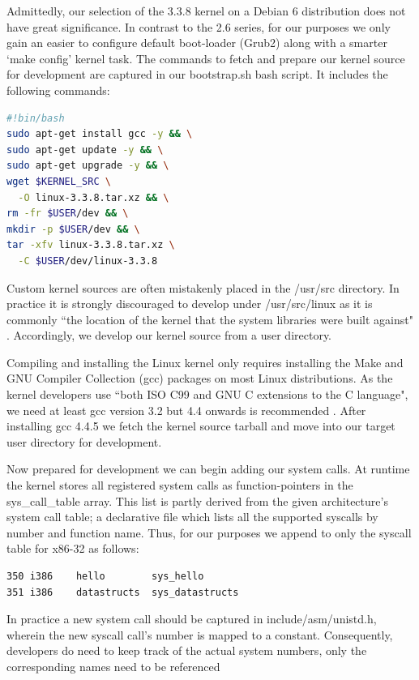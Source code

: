 \documentclass{article}
\begin{document}
\noindent Admittedly, our selection of the 3.3.8 kernel on a Debian 6 distribution
does not have great significance. In contrast to the 2.6 series, for our purposes 
we only gain an easier to configure default boot-loader (Grub2) along with a smarter 
`make config' kernel task. The commands to fetch and prepare our kernel source
for development are captured in our bootstrap\@.sh bash script. It includes the following commands: 
\begin{lstlisting}[language=Bash]
#!bin/bash
sudo apt-get install gcc -y && \
sudo apt-get update -y && \
sudo apt-get upgrade -y && \
wget $KERNEL_SRC \
  -O linux-3.3.8.tar.xz && \
rm -fr $USER/dev && \
mkdir -p $USER/dev && \
tar -xfv linux-3.3.8.tar.xz \
  -C $USER/dev/linux-3.3.8
\end{lstlisting} 
Custom kernel sources are often mistakenly placed in the /usr/src directory. 
In practice it is strongly discouraged to develop under /usr/src/linux as it is
commonly ``the location of the kernel that 
the system libraries were built against" \citep{Love}. Accordingly, we develop
our kernel source from a user directory.
\par
Compiling and installing the Linux kernel only
requires installing the Make and GNU Compiler Collection (gcc) packages on 
most Linux distributions. As the kernel
developers use ``both ISO C99 and GNU C extensions to the C language", 
we need at least gcc version 3\@.2 but 4\@.4 onwards is recommended \citep{Love7}. 
After installing gcc 4.4.5 we fetch the kernel source tarball and move into 
our target user directory for development.
\par
Now prepared for development we can begin adding our system calls.
At runtime the kernel stores all registered system calls as function-pointers 
in the sys\_call\_table array. This list is partly derived from the given architecture's system call table; 
a declarative file which lists all the supported syscalls by number and function name. Thus,
for our purposes we append to only the syscall table for x86-32 as follows:
\begin{lstlisting}[language=Bash,  tabsize=4,
  showspaces=false,
  showstringspaces=false]
350	i386	hello	     sys_hello
351	i386	datastructs  sys_datastructs
\end{lstlisting} 
In practice a new system call should be captured in include/asm/unistd\@.h, wherein 
the new syscall call's number is mapped to a constant. Consequently, developers
do need to keep track of the actual system numbers, only the corresponding names need to be referenced
\end{document}
